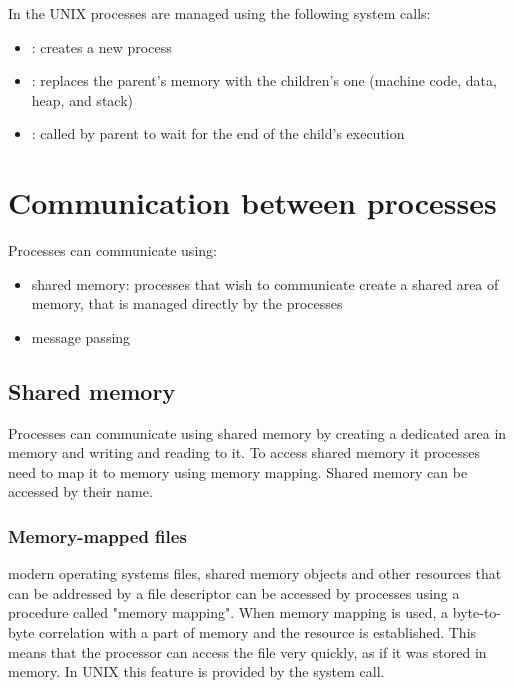 In the UNIX processes are managed using the following system calls:
\begin{itemize}
  \item {}: creates a new process
  \item {}: replaces the parent's memory with the children's one (machine code, data, heap, and stack)
  \item {}: called by parent to wait for the end of the child's execution
\end{itemize}



\section{Communication between processes}
Processes can communicate using:
\begin{itemize}
  \item shared memory: processes that wish to communicate create a shared area of memory, that is managed directly by the processes
  \item message passing
\end{itemize}


\subsection{Shared memory}
Processes can communicate using shared memory by creating a dedicated area in memory and writing and reading to it. To access shared memory it processes need to map it to memory using memory mapping. Shared memory can be accessed by their name.

\subsubsection{Memory-mapped files}
modern operating systems files, shared memory objects and other resources that can be addressed by a file descriptor can be accessed by processes using a procedure called "memory mapping". When memory mapping is used, a byte-to-byte correlation with a part of memory and the resource is established. This means that the processor can access the file very quickly, as if it was stored in memory. In UNIX this feature is provided by the  system call.

